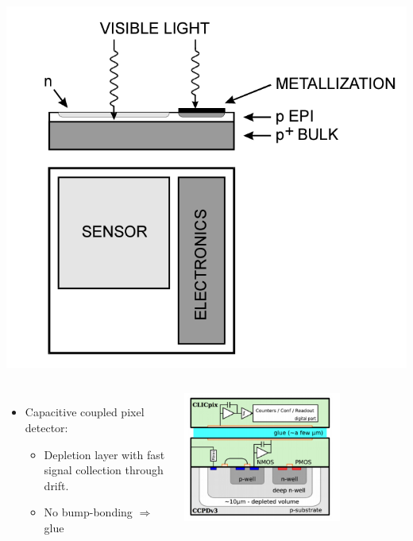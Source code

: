 \begin{frame}
\begin{columns}
    \centering
    \includegraphics[width=\textwidth]{figures/monolithic.pdf}
  \end{columns}

  \begin{columns}
    \begin{itemize}
    \item Capacitive coupled pixel detector:
      \begin{itemize}
      \item Depletion layer with fast signal collection through drift.
      \item No bump-bonding $\Rightarrow$ glue
      \end{itemize}
    \end{itemize}

    \centering
    \includegraphics[width=0.7\textwidth]{figures/HVCMOS_2stageAmpl.png}
  \end{columns}

\end{frame}

